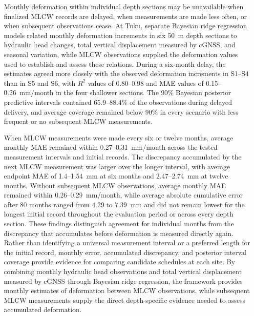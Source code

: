 Monthly deformation within individual depth sections may be unavailable when finalized MLCW records are delayed, when measurements are made less often, or when subsequent observations cease. At Tuku, separate Bayesian ridge regression models related monthly deformation increments in six 50~m depth sections to hydraulic head changes, total vertical displacement measured by cGNSS, and seasonal variation, while MLCW observations supplied the deformation values used to establish and assess these relations. During a six-month delay, the estimates agreed more closely with the observed deformation increments in S1--S4 than in S5 and S6, with $R^2$ values of 0.80--0.98 and MAE values of 0.15--0.26~mm/month in the four shallower sections. The 90\% Bayesian posterior predictive intervals contained 65.9--88.4\% of the observations during delayed delivery, and average coverage remained below 90\% in every scenario with less frequent or no subsequent MLCW measurements.

When MLCW measurements were made every six or twelve months, average monthly MAE remained within 0.27--0.31~mm/month across the tested measurement intervals and initial records. The discrepancy accumulated by the next MLCW measurement was larger over the longer interval, with average endpoint MAE of 1.4--1.54~mm at six months and 2.47--2.74~mm at twelve months. Without subsequent MLCW observations, average monthly MAE remained within 0.26--0.29~mm/month, while average absolute cumulative error after 80 months ranged from 4.29 to 7.39~mm and did not remain lowest for the longest initial record throughout the evaluation period or across every depth section. These findings distinguish agreement for individual months from the discrepancy that accumulates before deformation is measured directly again. Rather than identifying a universal measurement interval or a preferred length for the initial record, monthly error, accumulated discrepancy, and posterior interval coverage provide evidence for comparing candidate schedules at each site. By combining monthly hydraulic head observations and total vertical displacement measured by cGNSS through Bayesian ridge regression, the framework provides monthly estimates of deformation between MLCW observations, while subsequent MLCW measurements supply the direct depth-specific evidence needed to assess accumulated deformation.

\FloatBarrier
